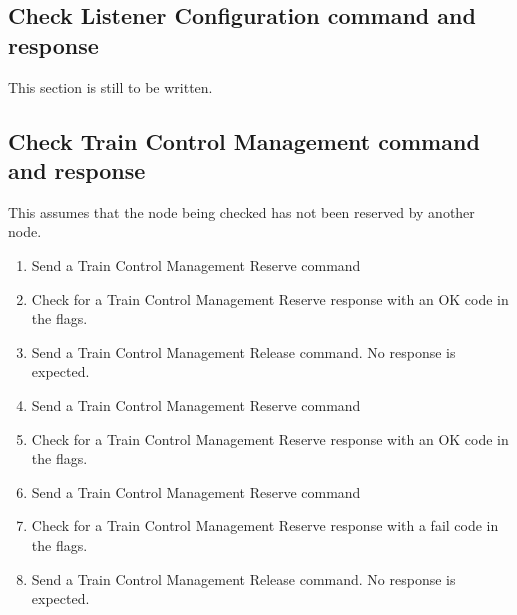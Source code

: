 \subsection{Check Listener Configuration command and response}

This section is still to be written.

\subsection{Check Train Control Management command and response}

This assumes that the node being checked has not been reserved by another node.

\begin{enumerate}

    \item Send a Train Control Management Reserve command
    \item Check for a Train Control Management Reserve response with an OK code in the flags.

    \item Send a Train Control Management Release command.  No response is expected.

    \item Send a Train Control Management Reserve command
    \item Check for a Train Control Management Reserve response with an OK code in the flags.

    \item Send a Train Control Management Reserve command
    \item Check for a Train Control Management Reserve response with a fail code in the flags.
    
    \item Send a Train Control Management Release command.  No response is expected.

\end{enumerate}

  
